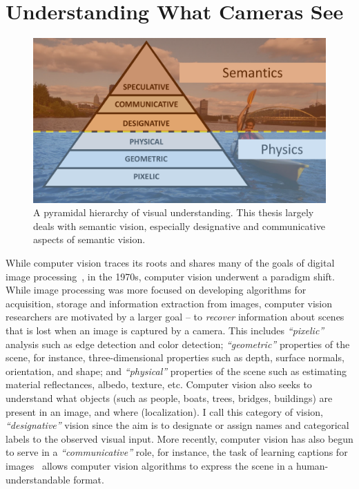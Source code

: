 \section{Understanding What Cameras See} 
\begin{figure}[t]
    \centering
    \includegraphics[width=\linewidth]{figures/visual_understanding_pyramid.pdf}
    \caption{A pyramidal hierarchy of visual understanding. This thesis largely deals with semantic vision, especially designative and communicative aspects of semantic vision.}
    \label{fig:visual_understanding_pyramid}
\end{figure}
While computer vision traces its roots and shares many of the goals of digital image processing~\citep{rosenfeld1976digital}, in the 1970s, computer vision underwent a paradigm shift.
While image processing was more focused on developing algorithms for acquisition, storage and information extraction from images, computer vision researchers are motivated by a larger goal -- to \textit{recover} information about scenes that is lost when an image is captured by a camera.
This includes \textit{``pixelic''} analysis such as edge detection and color detection; \textit{``geometric''} properties of the scene, for instance, three-dimensional properties such as depth, surface normals, orientation, and shape; and \textit{``physical''} properties of the scene such as estimating material reflectances, albedo, texture, etc. 
Computer vision also seeks to understand what objects (such as people, boats, trees, bridges, buildings) are present in an image, and where (localization). I call this category of vision, \textit{``designative''} vision since the aim is to designate or assign names and categorical labels to the observed visual input.
More recently, computer vision has also begun to serve in a \textit{``communicative''} role, for instance, the task of learning captions for images~\citep{yang2011corpus,karpathy2015deep} allows computer vision algorithms to express the scene in a human-understandable format.
